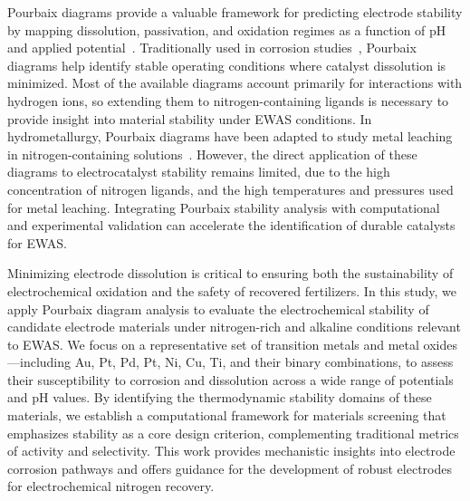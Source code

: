 \documentclass[journal=jacsat,manuscript=article]{achemso}
\begin{document}
Pourbaix diagrams provide a valuable framework for predicting electrode stability by mapping dissolution, passivation, and oxidation regimes as a function of pH and applied potential~\cite{PourbaixAtlasSolutions}. Traditionally used in corrosion studies~\cite{McCafferty2010ThermodynamicsDiagrams, Stack2005BridgingDiagrams,Pourbaix1973LecturesCorrosion}, Pourbaix diagrams help identify stable operating conditions where catalyst dissolution is minimized. Most of the available diagrams account primarily for interactions with hydrogen ions\cite{Huang2017ImprovedCompounds,Wang2020PredictingFunctional,Huang2015ElectrochemicalCalculations,Cao2020E-pHLaterite}, so extending them to nitrogen-containing ligands is necessary to provide insight into material stability under EWAS conditions. In hydrometallurgy, Pourbaix diagrams have been adapted to study metal leaching in nitrogen-containing solutions~\cite{Meng1996PrinciplesReview,NasuhaYahya2019ThermodynamicDiagram,Barragan2021LeachingOptimization,OConnor2018ElectrochemicalSolutions,Seke2006EffectSphalerite}. However, the direct application of these diagrams to electrocatalyst stability remains limited, due to the high concentration of nitrogen ligands, and the high temperatures and pressures used for metal leaching. Integrating Pourbaix stability analysis with computational and experimental validation can accelerate the identification of durable catalysts for EWAS.


Minimizing electrode dissolution is critical to ensuring both the sustainability of electrochemical oxidation and the safety of recovered fertilizers. In this study, we apply Pourbaix diagram analysis to evaluate the electrochemical stability of candidate electrode materials under nitrogen-rich and alkaline conditions relevant to EWAS. We focus on a representative set of transition metals and metal oxides—including Au, Pt, Pd, Pt, Ni, Cu, Ti, and their binary combinations, to assess their susceptibility to corrosion and dissolution across a wide range of potentials and pH values. By identifying the thermodynamic stability domains of these materials, we establish a computational framework for materials screening that emphasizes stability as a core design criterion, complementing traditional metrics of activity and selectivity. This work provides mechanistic insights into electrode corrosion pathways and offers guidance for the development of robust electrodes for electrochemical nitrogen recovery.
\end{document}
